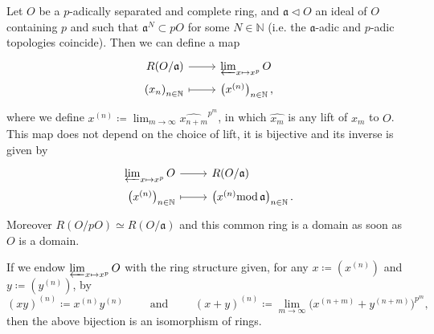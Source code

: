 \begin{prop}
	Let $O$ be a $p$-adically separated and complete ring, and $\mathfrak{a} \triangleleft O$
	an ideal of $O$ containing $p$ and such that $\mathfrak{a}^N \subset pO$ for some $N \in \mathbb{N}$
	(i.e. the $\mathfrak{a}$-adic and $p$-adic topologies coincide).
	Then we can define a map
	\begin{equation*}
	\begin{tikzcd}[row sep = 0ex
		,/tikz/column 1/.append style={anchor=base east}
		,/tikz/column 2/.append style={anchor=base west}]
		R(O/\mathfrak{a}) \arrow[r, "", rightarrow] &
		\varprojlim_{x \mapsto x^p} O \\
		\left( x_n \right)_{n \in \mathbb{N}} \arrow[r, "", mapsto] & 
		\left( x^{(n)} \right)_{n \in \mathbb{N}}
	,\end{tikzcd}
	\end{equation*} 
	where we define $x^{(n)} \coloneqq \lim_{m \to \infty} \widehat{x_{n+m}}^{p^m}$,
	in which $\widehat{x_m}$ is any lift of $x_m$ to $O$.
	This map does not depend on the choice of lift, it is bijective
	and its inverse is given by
	\begin{equation*}
	\begin{tikzcd}[row sep = 0ex
		,/tikz/column 1/.append style={anchor=base east}
		,/tikz/column 2/.append style={anchor=base west}]
		\varprojlim_{x \mapsto x^p} O \arrow[r, "", rightarrow] &
		R(O/\mathfrak{a}) \\
		\left( x^{(n)} \right)_{n \in \mathbb{N}} \arrow[r, "", mapsto] & 
		\left( x^{(n)} \mathrm{mod}\, \mathfrak{a} \right)_{n \in \mathbb{N}}
	.\end{tikzcd}
	\end{equation*} 
	Moreover $R(O/pO) \simeq R(O/\mathfrak{a})$ and this common ring
	is a domain as soon as $O$ is a domain.
\end{prop}


\begin{rem}[]
	If we endow $\varprojlim_{x \mapsto x^p} O$ with the ring structure
	given, for any $x \coloneqq \left( x^{(n)} \right)$ and 
	$y \coloneqq \left( y^{(n)} \right)$, 
	by
	\begin{equation*}
		\left( xy \right)^{(n)} \coloneqq x^{(n)} y^{(n)}
		\qquad \text{ and } \qquad
		\left( x + y \right)^{(n)} \coloneqq
		\lim_{m \to \infty} \big( x^{(n+m)} +
		y^{(n+m)}\big)^{p^m}
	,\end{equation*}
	then the above bijection is an isomorphism of rings.
\end{rem}


